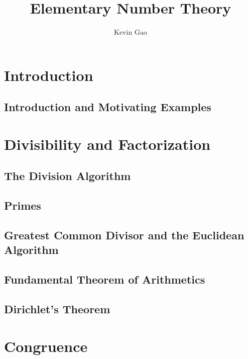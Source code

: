 \documentclass{book}
\title{Elementary Number Theory}
\author{Kevin Gao}
\begin{document}
\frontmatter

\maketitle
\tableofcontents

\cleardoublepage

\mainmatter

\part{Introduction}

\chapter{Introduction and Motivating Examples}


\part{Divisibility and Factorization}

\chapter{The Division Algorithm}


\chapter{Primes}


\chapter{Greatest Common Divisor and the Euclidean Algorithm}


\chapter{Fundamental Theorem of Arithmetics}


\chapter{Dirichlet's Theorem}


\part{Congruence}
\end{document}
